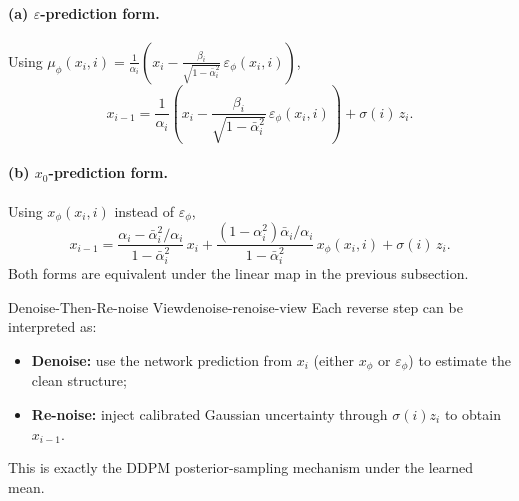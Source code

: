\documentclass[11pt,a4paper]{article}
\newcommand{\balpha}{\bar{\alpha}}
\begin{document}
\paragraph{(a) $\varepsilon$-prediction form.}
Using $\mu_\phi(x_i,i)=\frac{1}{\alpha_i}\!\left(x_i-\frac{\beta_i}{\sqrt{1-\balpha_i^2}}\,\varepsilon_\phi(x_i,i)\right)$,
\[
x_{i-1}
=\frac{1}{\alpha_i}\!\left(
x_i-\frac{\beta_i}{\sqrt{1-\balpha_i^2}}\,\varepsilon_\phi(x_i,i)
\right)+\sigma(i)\,z_i.
\]

\paragraph{(b) $x_0$-prediction form.}
Using $x_\phi(x_i,i)$ instead of $\varepsilon_\phi$,
\[
x_{i-1}
=\frac{\alpha_i-\balpha_i^2/\alpha_i}{1-\balpha_i^2}\,x_i
+\frac{(1-\alpha_i^2)\balpha_i/\alpha_i}{1-\balpha_i^2}\,x_\phi(x_i,i)
+\sigma(i)\,z_i.
\]
Both forms are equivalent under the linear map in the previous subsection.

\begin{remark}{Denoise-Then-Re-noise View}{denoise-renoise-view}
Each reverse step can be interpreted as:
\begin{itemize}[leftmargin=1.2em, itemsep=2pt]
    \item \textbf{Denoise:} use the network prediction from $x_i$ (either $x_\phi$ or $\varepsilon_\phi$) to estimate the clean structure;
    \item \textbf{Re-noise:} inject calibrated Gaussian uncertainty through $\sigma(i)z_i$ to obtain $x_{i-1}$.
\end{itemize}
This is exactly the DDPM posterior-sampling mechanism under the learned mean.
\end{remark}
\end{document}
